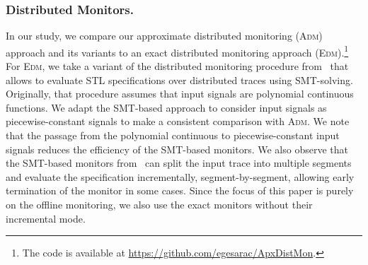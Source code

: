 \subsubsection{Distributed Monitors.}
In our study, we compare our approximate distributed monitoring (\textsc{Adm}) approach and its variants to an exact distributed monitoring approach (\textsc{Edm}).\footnote[1]{The code is available at \url{https://github.com/egesarac/ApxDistMon}.}
For \textsc{Edm}, we take a variant of the distributed monitoring procedure from~\cite{MomtazAB23} that allows to evaluate STL specifications over distributed traces using SMT-solving.
Originally, that procedure assumes that input signals are polynomial continuous functions.
We adapt the SMT-based approach to consider input signals as piecewise-constant signals to make a consistent comparison with \textsc{Adm}.
We note that the passage from the polynomial continuous to piecewise-constant input signals reduces the efficiency of the SMT-based monitors.
We also observe that the SMT-based monitors from~\cite{MomtazAB23} can split the input trace into multiple segments and evaluate the specification incrementally, segment-by-segment, allowing early termination of the monitor in some cases.
Since the focus of this paper is purely on the offline monitoring, we also use the exact monitors without their incremental mode.


